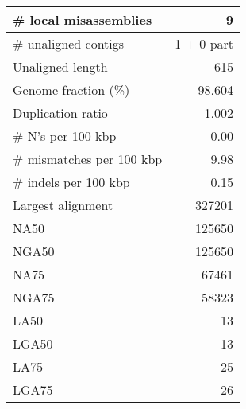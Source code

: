\documentclass[12pt,a4paper]{article}
\begin{document}
\begin{table}[ht]
\begin{center}
\begin{tabular}{|l*{1}{|r}|}
\# local misassemblies & 9 \\ \hline
\# unaligned contigs & 1 + 0 part \\ \hline
Unaligned length & 615 \\ \hline
Genome fraction (\%) & 98.604 \\ \hline
Duplication ratio & 1.002 \\ \hline
\# N's per 100 kbp & 0.00 \\ \hline
\# mismatches per 100 kbp & 9.98 \\ \hline
\# indels per 100 kbp & 0.15 \\ \hline
Largest alignment & 327201 \\ \hline
NA50 & 125650 \\ \hline
NGA50 & 125650 \\ \hline
NA75 & 67461 \\ \hline
NGA75 & 58323 \\ \hline
LA50 & 13 \\ \hline
LGA50 & 13 \\ \hline
LA75 & 25 \\ \hline
LGA75 & 26 \\ \hline
\end{tabular}
\end{center}
\end{table}
\end{document}
